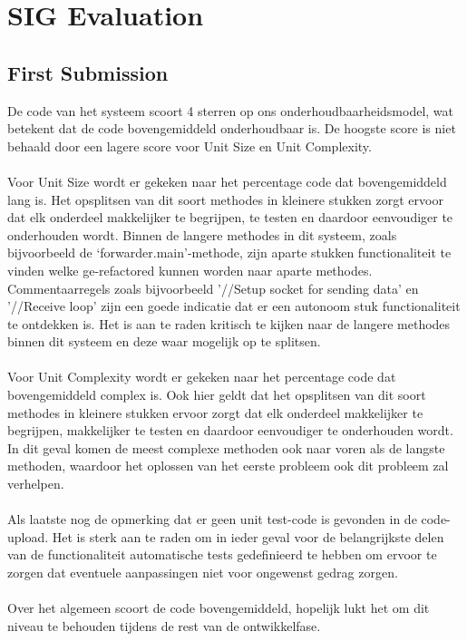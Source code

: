 \chapter{SIG Evaluation}
\section{First Submission}
De code van het systeem scoort 4 sterren op ons onderhoudbaarheidsmodel, wat betekent dat de code bovengemiddeld onderhoudbaar is. De hoogste score is niet behaald door een lagere score voor Unit Size en Unit Complexity.\\\\
Voor Unit Size wordt er gekeken naar het percentage code dat bovengemiddeld lang is. Het opsplitsen van dit soort methodes in kleinere stukken zorgt ervoor dat elk onderdeel makkelijker te begrijpen, te testen en daardoor eenvoudiger te onderhouden wordt. Binnen de langere methodes in dit systeem, zoals bijvoorbeeld de ‘forwarder.main’-methode, zijn aparte stukken functionaliteit te vinden welke ge-refactored kunnen worden naar aparte methodes. Commentaarregels zoals bijvoorbeeld '//Setup socket for sending data' en '//Receive loop' zijn een goede indicatie dat er een autonoom stuk functionaliteit te ontdekken is. Het is aan te raden kritisch te kijken naar de langere methodes binnen dit systeem en deze waar mogelijk op te splitsen.\\\\
Voor Unit Complexity wordt er gekeken naar het percentage code dat bovengemiddeld complex is. Ook hier geldt dat het opsplitsen van dit soort methodes in kleinere stukken ervoor zorgt dat elk onderdeel makkelijker te begrijpen, makkelijker te testen en daardoor eenvoudiger te onderhouden wordt. In dit geval komen de meest complexe methoden ook naar voren als de langste methoden, waardoor het oplossen van het eerste probleem ook dit probleem zal verhelpen.\\\\
Als laatste nog de opmerking dat er geen unit test-code is gevonden in de code-upload. Het is sterk aan te raden om in ieder geval voor de belangrijkste delen van de functionaliteit automatische tests gedefinieerd te hebben om ervoor te zorgen dat eventuele aanpassingen niet voor ongewenst gedrag zorgen.\\\\
Over het algemeen scoort de code bovengemiddeld, hopelijk lukt het om dit niveau te behouden tijdens de rest van de ontwikkelfase. 

 